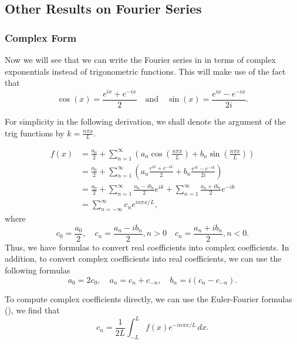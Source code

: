 
\subsection{Other Results on Fourier Series}

\subsubsection{Complex Form}\label{sec:fouriercomplex}

Now we will see that we can write the Fourier series in  in terms of complex exponentials instead of trigonometric functions. This will make use of the fact that
\[
\cos(x) = \frac{e^{ix} + e^{-ix}}{2} \quad \text{and} \quad \sin(x) = \frac{e^{ix} - e^{-ix}}{2i}.
\]

For simplicity in the following derivation, we shall denote the argument of the trig functions by $k = \frac{n\pi x}{L}$.

\begin{align*}
	f(x) &= \frac{a_0}{2} + \sum_{n=1}^{\infty} \left(a_n \cos{\left(\frac{n\pi x}{L}\right)} + b_n \sin{\left(\frac{n\pi x}{L}\right)}\right) \\
	&= \frac{a_0}{2} + \sum_{n=1}^{\infty} \left(a_n \frac{e^{ik} + e^{-ik}}{2} + b_n \frac{e^{ik} - e^{-ik}}{2i}\right) \\
	&= \frac{a_0}{2} + \sum_{n=1}^{\infty} \frac{a_n - ib_n}{2} e^{ik} + \sum_{n=1}^{\infty} \frac{a_n + ib_n}{2} e^{-ik} \\
	&= \sum_{n=-\infty}^{\infty} c_n e^{in\pi x/L},
\end{align*}
where
\[
c_0 = \frac{a_0}{2}, \quad c_n = \frac{a_n - ib_n}{2}, n>0 \quad c_n = \frac{a_n + ib_n}{2}, n<0.
\]
Thus, we have formulas to convert real coefficients into complex coefficients. In addition, to convert complex coefficients into real coefficients, we can use the following formulas
\[
a_0 = 2c_0, \quad a_n = c_n + c_{-n}, \quad b_n = i(c_n - c_{-n}).
\]

To compute complex coefficients directly, we can use the Euler-Fourier formulas (), we find that
\begin{equation}\label{eq:fouriercomplexcoeffs}
	c_n = \frac{1}{2L} \int_{-L}^L f(x) e^{-in\pi x/L} \,dx.
\end{equation}

